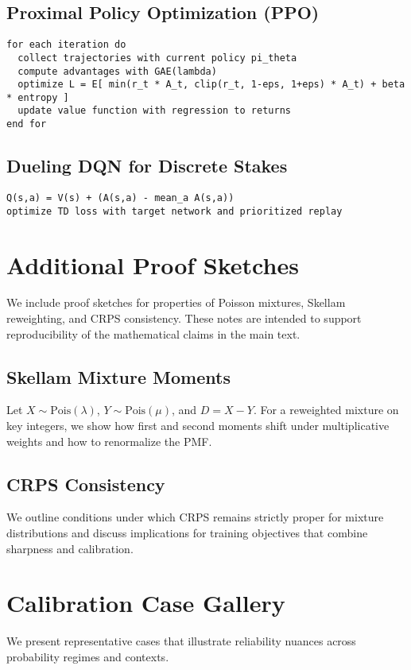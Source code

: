 \documentclass[12pt]{report}  %
\numberwithin{equation}{section}
\theoremstyle{plain}
\theoremstyle{definition}
\theoremstyle{remark}
\begin{document}
\section{Proximal Policy Optimization (PPO)}
\begin{verbatim}
for each iteration do
  collect trajectories with current policy pi_theta
  compute advantages with GAE(lambda)
  optimize L = E[ min(r_t * A_t, clip(r_t, 1-eps, 1+eps) * A_t) + beta * entropy ]
  update value function with regression to returns
end for
\end{verbatim}


\section{Dueling DQN for Discrete Stakes}
\begin{verbatim}
Q(s,a) = V(s) + (A(s,a) - mean_a A(s,a))
optimize TD loss with target network and prioritized replay
\end{verbatim}

\chapter{Additional Proof Sketches}
We include proof sketches for properties of Poisson mixtures, Skellam reweighting, and CRPS consistency. These notes are intended to support reproducibility of the mathematical claims in the main text.

\fi

\section{Skellam Mixture Moments}
Let $X\sim\text{Pois}(\lambda)$, $Y\sim\text{Pois}(\mu)$, and $D=X-Y$. For a reweighted mixture on key integers, we show how first and second moments shift under multiplicative weights and how to renormalize the PMF.

\section{CRPS Consistency}
We outline conditions under which CRPS remains strictly proper for mixture distributions and discuss implications for training objectives that combine sharpness and calibration.

\chapter{Calibration Case Gallery}
We present representative cases that illustrate reliability nuances across probability regimes and contexts.
\end{document}
